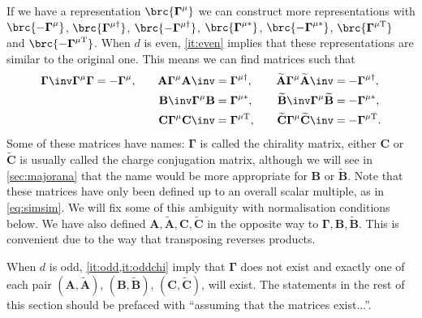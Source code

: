 \documentclass[11pt]{article}
\newcommand{\Gammab}{\boldsymbol{\Gamma}}
\newcommand{\mud}{{\mu\dag}}
\newcommand{\mut}{{\mu\mathrm{T}}}
\newcommand{\muc}{{\mu\ast}}
\newcommand{\A}{\mathbf{A}}
\newcommand{\B}{\mathbf{B}}
\renewcommand{\C}{\mathbf{C}}
\newcommand{\At}{\widetilde{\A}}
\newcommand{\Bt}{\widetilde{\B}}
\newcommand{\Ct}{\widetilde{\C}}
\begin{document}
If we have a representation $\brc{\Gammab^\mu}$ we can construct more representations with $\brc{-\Gammab^\mu}$, $\brc{\Gammab^\mud}$, $\brc{-\Gammab^\mud}$, $\brc{\Gammab^\muc}$, $\brc{-\Gammab^\muc}$, $\brc{\Gammab^\mut}$ and $\brc{-\Gammab^\mut}$.
When $d$ is even, \cref{it:even} implies that these representations are similar to the original one.
This means we can find matrices such that
%
\begin{equation}\label{eq:cccmats}
\begin{aligned}
  \Gammab\inv \Gammab^\mu \Gammab &= -\Gammab^\mu, &\quad
  \A  \Gammab^\mu \A\inv  &=  \Gammab^\mud, &\quad
  \At \Gammab^\mu \At\inv &= -\Gammab^\mud, \\ &&
  \B\inv  \Gammab^\mu \B  &=  \Gammab^\muc, &
  \Bt\inv \Gammab^\mu \Bt &= -\Gammab^\muc, \\ &&
  \C  \Gammab^\mu \C\inv  &=  \Gammab^\mut, &
  \Ct \Gammab^\mu \Ct\inv &= -\Gammab^\mut.
\end{aligned}
\end{equation}
%
Some of these matrices have names: $\Gammab$ is called the chirality matrix, either $\C$ or $\Ct$ is usually called the charge conjugation matrix, although we will see in \cref{sec:majorana} that the name would be more appropriate for $\B$ or $\Bt$.
Note that these matrices have only been defined up to an overall scalar multiple, as in \cref{eq:simsim}.
We will fix some of this ambiguity with normalisation conditions below.
We have also defined $\A,\At,\C,\Ct$ in the opposite way to $\Gammab,\B,\Bt$.
This is convenient due to the way that transposing reverses products.

When $d$ is odd, \cref{it:odd,it:oddchi} imply that $\Gammab$ does not exist and exactly one of each pair $(\A, \At)$, $(\B, \Bt)$, $(\C, \Ct)$, will exist.
The statements in the rest of this section should be prefaced with ``assuming that the matrices exist...''.
\end{document}
